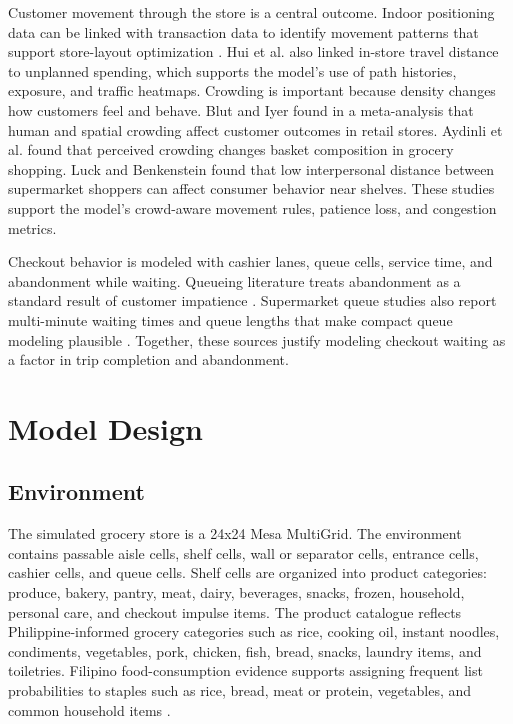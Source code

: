 \documentclass[sigconf,nonacm]{acmart}
\begin{document}
Customer movement through the store is a central outcome. Indoor positioning data can be linked with transaction data to identify movement patterns that support store-layout optimization \citep{hwangbo2017}. Hui et al. \citeyearpar{hui2013} also linked in-store travel distance to unplanned spending, which supports the model's use of path histories, exposure, and traffic heatmaps. Crowding is important because density changes how customers feel and behave. Blut and Iyer \citeyearpar{blut2020} found in a meta-analysis that human and spatial crowding affect customer outcomes in retail stores. Aydinli et al. \citeyearpar{aydinli2021} found that perceived crowding changes basket composition in grocery shopping. Luck and Benkenstein \citeyearpar{luck2015} found that low interpersonal distance between supermarket shoppers can affect consumer behavior near shelves. These studies support the model's crowd-aware movement rules, patience loss, and congestion metrics.

Checkout behavior is modeled with cashier lanes, queue cells, service time, and abandonment while waiting. Queueing literature treats abandonment as a standard result of customer impatience \citep{dai2013}. Supermarket queue studies also report multi-minute waiting times and queue lengths that make compact queue modeling plausible \citep{mohamad2022,chandra2023}. Together, these sources justify modeling checkout waiting as a factor in trip completion and abandonment.

\section{Model Design}

\subsection{Environment}

The simulated grocery store is a 24x24 Mesa MultiGrid. The environment contains passable aisle cells, shelf cells, wall or separator cells, entrance cells, cashier cells, and queue cells. Shelf cells are organized into product categories: produce, bakery, pantry, meat, dairy, beverages, snacks, frozen, household, personal care, and checkout impulse items. The product catalogue reflects Philippine-informed grocery categories such as rice, cooking oil, instant noodles, condiments, vegetables, pork, chicken, fish, bread, snacks, laundry items, and toiletries. Filipino food-consumption evidence supports assigning frequent list probabilities to staples such as rice, bread, meat or protein, vegetables, and common household items \citep{angeles2019}.
\end{document}
